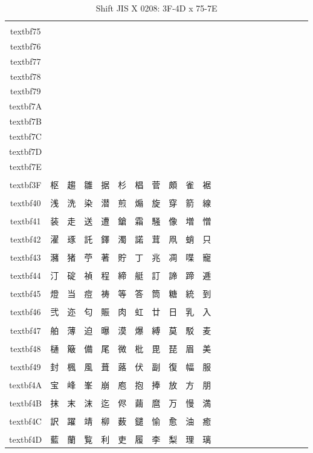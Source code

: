 \begin{table}[H]
\centering
\caption{Shift JIS X 0208: 3F-4D x 75-7E}
\begin{tabular}{|Sc|Sc|Sc|Sc|Sc|Sc|Sc|Sc|Sc|Sc|Sc|}
\hline
 & \\textbf{75} & \\textbf{76} & \\textbf{77} & \\textbf{78} & \\textbf{79} & \\textbf{7A} & \\textbf{7B} & \\textbf{7C} & \\textbf{7D} & \\textbf{7E} \\ \hline
\\textbf{3F} & 枢 & 趨 & 雛 & 据 & 杉 & 椙 & 菅 & 頗 & 雀 & 裾 \\ \hline
\\textbf{40} & 浅 & 洗 & 染 & 潜 & 煎 & 煽 & 旋 & 穿 & 箭 & 線 \\ \hline
\\textbf{41} & 装 & 走 & 送 & 遭 & 鎗 & 霜 & 騒 & 像 & 増 & 憎 \\ \hline
\\textbf{42} & 濯 & 琢 & 託 & 鐸 & 濁 & 諾 & 茸 & 凧 & 蛸 & 只 \\ \hline
\\textbf{43} & 瀦 & 猪 & 苧 & 著 & 貯 & 丁 & 兆 & 凋 & 喋 & 寵 \\ \hline
\\textbf{44} & 汀 & 碇 & 禎 & 程 & 締 & 艇 & 訂 & 諦 & 蹄 & 逓 \\ \hline
\\textbf{45} & 燈 & 当 & 痘 & 祷 & 等 & 答 & 筒 & 糖 & 統 & 到 \\ \hline
\\textbf{46} & 弐 & 迩 & 匂 & 賑 & 肉 & 虹 & 廿 & 日 & 乳 & 入 \\ \hline
\\textbf{47} & 舶 & 薄 & 迫 & 曝 & 漠 & 爆 & 縛 & 莫 & 駁 & 麦 \\ \hline
\\textbf{48} & 樋 & 簸 & 備 & 尾 & 微 & 枇 & 毘 & 琵 & 眉 & 美 \\ \hline
\\textbf{49} & 封 & 楓 & 風 & 葺 & 蕗 & 伏 & 副 & 復 & 幅 & 服 \\ \hline
\\textbf{4A} & 宝 & 峰 & 峯 & 崩 & 庖 & 抱 & 捧 & 放 & 方 & 朋 \\ \hline
\\textbf{4B} & 抹 & 末 & 沫 & 迄 & 侭 & 繭 & 麿 & 万 & 慢 & 満 \\ \hline
\\textbf{4C} & 訳 & 躍 & 靖 & 柳 & 薮 & 鑓 & 愉 & 愈 & 油 & 癒 \\ \hline
\\textbf{4D} & 藍 & 蘭 & 覧 & 利 & 吏 & 履 & 李 & 梨 & 理 & 璃 \\ \hline
\end{tabular}
\end{table}

